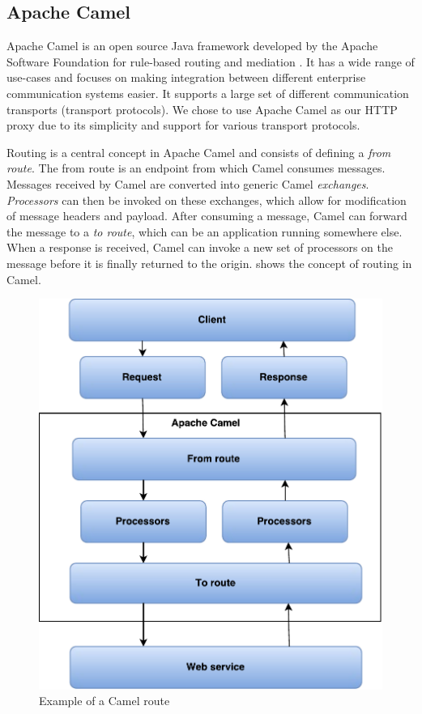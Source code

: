 \subsection{Apache Camel}

Apache Camel is an open source Java framework developed by the Apache Software
Foundation for rule-based routing and mediation \cite{camel-homepage}. It has a
wide range of use-cases and focuses on making integration between different
enterprise communication systems easier. It supports a large set of different
communication transports (transport protocols). We chose to use Apache Camel as
our HTTP proxy due to its simplicity and support for various transport
protocols.

Routing is a central concept in Apache Camel and consists of defining a
\textit{from route}. The from route is an endpoint from which Camel consumes
messages. Messages received by Camel are converted into generic Camel
\textit{exchanges}. \textit{Processors} can then be invoked on these exchanges,
which allow for modification of message headers and payload. After consuming a
message, Camel can forward the message to a \textit{to route}, which can be an
application running somewhere else. When a response is received, Camel can
invoke a new set of processors on the message before it is finally returned to
the origin.  shows the concept of routing in Camel.

\begin{figure}[h]
\centering
\includegraphics[scale=0.6]{images/camel_routes.pdf}
\caption{Example of a Camel route}
\label{figure:camel-route}
\end{figure}

